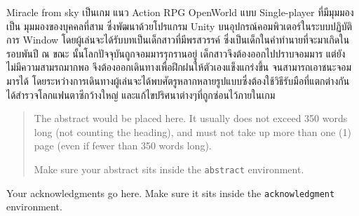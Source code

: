 \maketitle
\makesignature

\ifproject
\begin{abstractTH}
\enskip \enskip \enskip \enskip \enskip  Miracle from sky เป็นเกม แนว Action RPG OpenWorld แบบ Single-player ที่มีมุมมองเป็น มุมมองของบุคคลที่สาม ซึ่งพัฒนาด้วยโปรแกรม Unity บนอุปกรณ์คอมพิวเตอร์ในระบบปฏิบัติการ Window โดยผู้เล่นจะได้รับบทเป็นเด็กสาวที่มีพรสวรรค์ ซึ่งเป็นเด็กในคำทำนายที่จะมาเกิดในรอบพันปี ณ ขณะ นั้นโลกปัจจุบันถูกจอมมารรุกรานอยู่ เด็กสาวจึงต้องออกไปปราบจอมมาร แต่ยังไม่มีความสามรถมากพอ จึงต้องออกเดินทางเพื่อฝึกฝนให้ตัวเองแข็งแกร่งขึ้น จนสามารถเอาชนะจอมมารได้ โดยระหว่างการเดินทางผู้เล่นจะได้พบศัตรูหลากหลายรูปแบบซึ่งต้องใช้วิธีรับมือที่แตกต่างกัน ได้สำรวจโลกแฟนตาซีกว้างใหญ่ และแก้ไขปริศนาต่างๆที่ถูกซ่อนไว้ภายในเกม

\end{abstractTH}

\begin{abstract}
The abstract would be placed here. It usually does not exceed 350 words
long (not counting the heading), and must not take up more than one (1) page
(even if fewer than 350 words long).

Make sure your abstract sits inside the \texttt{abstract} environment.
\end{abstract}

\iffalse
\begin{dedication}
This document is dedicated to all Chiang Mai University students.

Dedication page is optional.
\end{dedication}
\fi %

\begin{acknowledgments}
Your acknowledgments go here. Make sure it sits inside the
\texttt{acknowledgment} environment.

\end{acknowledgments}%
\fi %

\contentspage

\ifproject
\figurelistpage

\tablelistpage
\fi %



